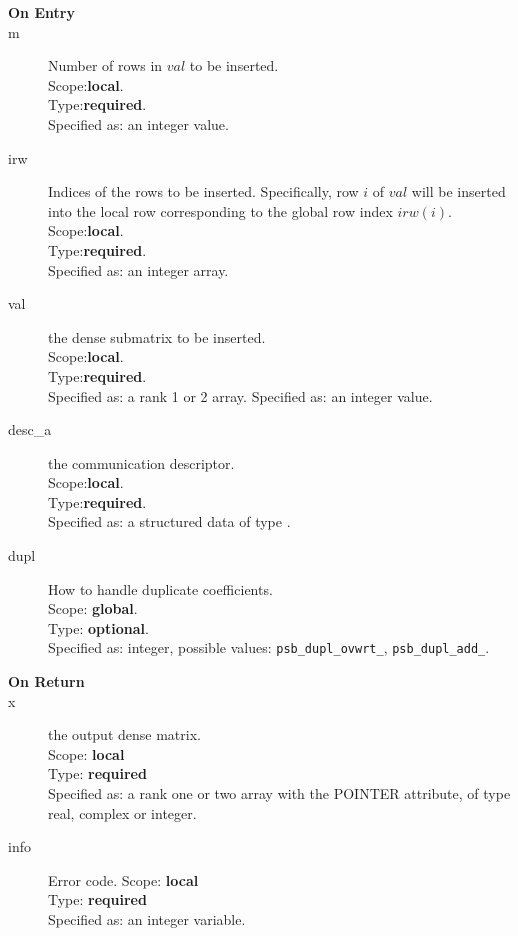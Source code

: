 
\begin{description}
\item[\bf On Entry]
\item[m] Number of rows in $val$  to be inserted.\\
Scope:{\bf local}.\\
Type:{\bf required}.\\
Specified as: an integer value.
\item[irw] Indices of the rows to be inserted. Specifically, row $i$
  of $val$ will be inserted into the local row corresponding to the
  global row index $irw(i)$.
Scope:{\bf local}.\\
Type:{\bf required}.\\
Specified as: an integer array.
\item[val] the dense submatrix to be inserted.\\
Scope:{\bf local}.\\
Type:{\bf required}.\\
Specified as: a rank 1 or 2  array.
Specified as: an integer value.
\item[desc\_a] the communication descriptor.\\
Scope:{\bf local}.\\
Type:{\bf required}.\\
Specified as: a structured data of type \descdata.
\item[dupl] How to handle duplicate coefficients.\\
Scope: {\bf global}.\\
Type: {\bf optional}.\\
Specified as: integer, possible values: \verb|psb_dupl_ovwrt_|,
\verb|psb_dupl_add_|.
\end{description}

\begin{description}
\item[\bf On Return]
\item[x] the output dense matrix.\\
Scope: {\bf local} \\
Type: {\bf required}\\
Specified as: a rank one or two array with the POINTER
attribute, of type real, complex or integer.\\
\item[info] Error code.
Scope: {\bf local} \\
Type: {\bf required}\\
Specified as: an integer variable.
\end{description}

